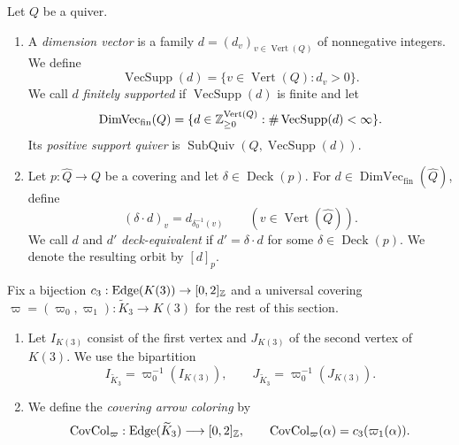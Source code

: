 \begin{definition}\label{def:cover-dimension-vectors}
Let $Q$ be a quiver.
\begin{enumerate}[font=\itshape]
\item A \textit{dimension vector} is a family $d=(d_v)_{v\in\operatorname{Vert}(Q)}$
of nonnegative integers. We define
\[
 \operatorname{VecSupp}(d)=\{v\in\operatorname{Vert}(Q):d_v>0\}.
\]
We call $d$ \textit{finitely supported} if $\operatorname{VecSupp}(d)$ is finite and let
\[
 \operatorname{DimVec}_{\mathrm{fin}}(Q)
 =\{d\in\mathbb Z_{\ge0}^{\operatorname{Vert}(Q)}:\#\operatorname{VecSupp}(d)<\infty\}.
\]
Its \textit{positive support quiver} is $\operatorname{SubQuiv}(Q,\operatorname{VecSupp}(d))$.
\item Let $p:\widehat Q\to Q$ be a covering and let $\delta\in\operatorname{Deck}(p)$.
For $d\in\operatorname{DimVec}_{\mathrm{fin}}(\widehat Q)$, define
\[
 (\delta\cdot d)_v=d_{\delta_0^{-1}(v)}
 \qquad(v\in\operatorname{Vert}(\widehat Q)).
\]
We call $d$ and $d'$ \textit{deck-equivalent} if $d'=\delta\cdot d$ for some $\delta\in\operatorname{Deck}(p)$.
We denote the resulting orbit by $[d]_p$.
\end{enumerate}
\end{definition}

\begin{definition}\label{def:covering-arrow-coloring}
Fix a bijection $c_3:\operatorname{Edge}(K(3))\to[0,2]_{\mathbb Z}$ and a universal covering
$\varpi=(\varpi_0,\varpi_1):\widetilde K_3\to K(3)$ for the rest of this section.
\begin{enumerate}[font=\itshape]
\item Let $I_{K(3)}$ consist of the first vertex and $J_{K(3)}$ of the second vertex of $K(3)$.
We use the bipartition
\[
 I_{\widetilde K_3}=\varpi_0^{-1}(I_{K(3)}),\qquad
 J_{\widetilde K_3}=\varpi_0^{-1}(J_{K(3)}).
\]
\item We define the \textit{covering arrow coloring} by
\[
 \operatorname{CovCol}_{\varpi}:\operatorname{Edge}(\widetilde K_3)\longrightarrow[0,2]_{\mathbb Z},\qquad
 \operatorname{CovCol}_{\varpi}(\alpha)=c_3(\varpi_1(\alpha)).
\]
\end{enumerate}
\end{definition}

